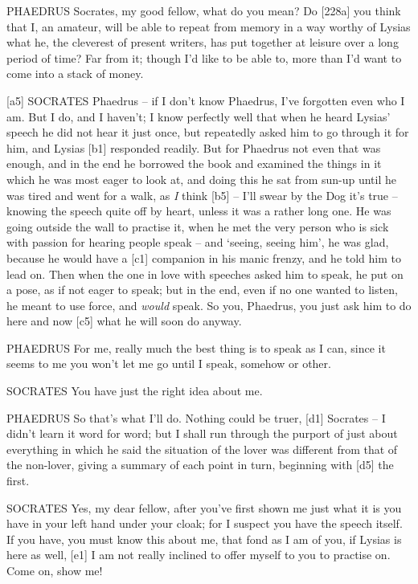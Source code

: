 PHAEDRUS Socrates, my good fellow, what do you mean? Do {[}228a{]} you
think that I, an amateur, will be able to repeat from memory in a way
worthy of Lysias what he, the cleverest of present writers, has put
together at leisure over a long period of time? Far from it; though I'd
like to be able to, more than I'd want to come into a stack of money.

{[}a5{]} SOCRATES Phaedrus -- if I don't know Phaedrus, I've forgotten
even who I am. But I do, and I haven't; I know perfectly well that when
he heard Lysias' speech he did not hear it just once, but repeatedly
asked him to go through it for him, and Lysias {[}b1{]} responded
readily. But for Phaedrus not even that was enough, and in the end he
borrowed the book and examined the things in it which he was most eager
to look at, and doing this he sat from sun-up until he was tired and
went for a walk, as {\em I} think {[}b5{]} -- I'll swear by the
Dog it's true -- knowing
the speech quite off by heart, unless it was a rather long one. He was
going outside the wall to practise it, when he met the very person who
is sick with passion for hearing people
speak -- and ‘seeing,
seeing him', he was glad,
because he would have a {[}c1{]} companion in his manic frenzy, and he
told him to lead on. Then when the one in love with speeches asked him
to speak, he put on a pose, as if not eager to speak; but in the end,
even if no one wanted to listen, he meant to use force, and {\em would}
speak. So you, Phaedrus, you just ask him to do here and now {[}c5{]}
what he will soon do anyway.

PHAEDRUS For me, really much the best thing is to speak as I can, since
it seems to me you won't let me go until I speak, somehow or other.

SOCRATES You have just the right idea about me.

PHAEDRUS So that's what I'll do. Nothing could be truer, {[}d1{]}
Socrates -- I didn't learn it word for word; but I shall run through the
purport of just about everything in which he said the situation of the
lover was different from that of the non-lover, giving a summary of each
point in turn, beginning with {[}d5{]} the first.

SOCRATES Yes, my dear fellow, after you've first shown me just what it
is you have in your left hand under your cloak; for I suspect you have
the speech itself. If you have, you must know this about me, that fond
as I am of you, if Lysias is here as well, {[}e1{]} I am not really
inclined to offer myself to you to practise on. Come on, show me!

